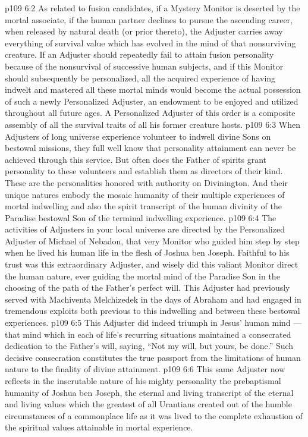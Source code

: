 \vs p109 6:2 As related to fusion candidates, if a Mystery Monitor is deserted by the mortal associate, if the human partner declines to pursue the ascending career, when released by natural death (or prior thereto), the Adjuster carries away everything of survival value which has evolved in the mind of that nonsurviving creature. If an Adjuster should repeatedly fail to attain fusion personality because of the nonsurvival of successive human subjects, and if this Monitor should subsequently be personalized, all the acquired experience of having indwelt and mastered all these mortal minds would become the actual possession of such a newly Personalized Adjuster, an endowment to be enjoyed and utilized throughout all future ages. A Personalized Adjuster of this order is a composite assembly of all the survival traits of all his former creature hosts.
\vs p109 6:3 When Adjusters of long universe experience volunteer to indwell divine Sons on bestowal missions, they full well know that personality attainment can never be achieved through this service. But often does the Father of spirits grant personality to these volunteers and establish them as directors of their kind. These are the personalities honored with authority on Divinington. And their unique natures embody the mosaic humanity of their multiple experiences of mortal indwelling and also the spirit transcript of the human divinity of the Paradise bestowal Son of the terminal indwelling experience.
\vs p109 6:4 The activities of Adjusters in your local universe are directed by the Personalized Adjuster of Michael of Nebadon, that very Monitor who guided him step by step when he lived his human life in the flesh of Joshua ben Joseph. Faithful to his trust was this extraordinary Adjuster, and wisely did this valiant Monitor direct the human nature, ever guiding the mortal mind of the Paradise Son in the choosing of the path of the Father’s perfect will. This Adjuster had previously served with Machiventa Melchizedek in the days of Abraham and had engaged in tremendous exploits both previous to this indwelling and between these bestowal experiences.
\vs p109 6:5 This Adjuster did indeed triumph in Jesus’ human mind --- that mind which in each of life’s recurring situations maintained a consecrated dedication to the Father’s will, saying, “Not my will, but yours, be done.” Such decisive consecration constitutes the true passport from the limitations of human nature to the finality of divine attainment.
\vs p109 6:6 This same Adjuster now reflects in the inscrutable nature of his mighty personality the prebaptismal humanity of Joshua ben Joseph, the eternal and living transcript of the eternal and living values which the greatest of all Urantians created out of the humble circumstances of a commonplace life as it was lived to the complete exhaustion of the spiritual values attainable in mortal experience.
